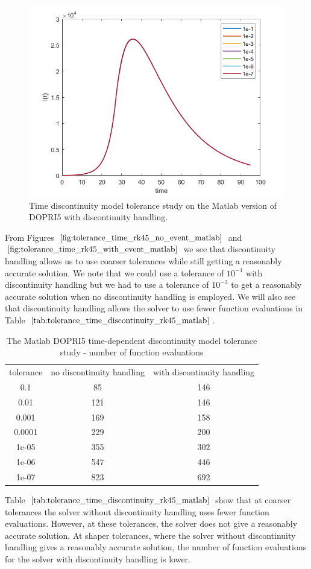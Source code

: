 \begin{figure}[H]
\centering
\includegraphics[width=0.7\linewidth]{./figures/tolerance_time_rk45_with_event_matlab}
\caption{Time discontinuity model tolerance study on the Matlab version of DOPRI5 with discontinuity handling.}
\label{fig:tolerance_time_rk45_with_event_matlab}
\end{figure}

From Figures $\ref{fig:tolerance_time_rk45_no_event_matlab}$ and $\ref{fig:tolerance_time_rk45_with_event_matlab}$ we see that discontinuity handling allows us to use coarser tolerances while still getting a reasonably accurate solution. We note that we could use a tolerance of $10^{-1}$ with discontinuity handling but we had to use a tolerance of $10^{-3}$ to get a reasonably accurate solution when no discontinuity handling is employed. We will also see that discontinuity handling allows the solver to use fewer function evaluations in Table $\ref{tab:tolerance_time_discontinuity_rk45_matlab}$.

\begin{table}[H]
\caption {The Matlab DOPRI5 time-dependent discontinuity model tolerance study - number of function evaluations} 
\label{tab:tolerance_time_discontinuity_rk45_matlab} 
\begin{center}
\begin{tabular}{ c c c }
tolerance & no discontinuity handling & with discontinuity handling\\ 
0.1 & 85 & 146 \\
0.01 & 121 & 146 \\
0.001 & 169 & 158 \\
0.0001 & 229 & 200 \\
1e-05 & 355 & 302 \\
1e-06 & 547 & 446 \\
1e-07 & 823 & 692 \\
\end{tabular}
\end{center}
\end{table}

Table $\ref{tab:tolerance_time_discontinuity_rk45_matlab}$ show that at coarser tolerances the solver without discontinuity handling uses fewer function evaluations. However, at these tolerances, the solver does not give a reasonably accurate solution. At shaper tolerances, where the solver without discontinuity handling gives a reasonably accurate solution, the number of function evaluations for the solver with discontinuity handling is lower.
